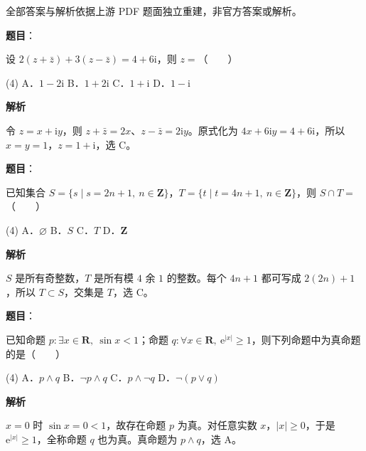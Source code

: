 

\begin{gktip}
全部答案与解析依据上游 PDF 题面独立重建，非官方答案或解析。
\end{gktip}


\begin{answer}

\textbf{题目}：

设 $2(z+\bar z)+3(z-\bar z)=4+6\mathrm i$，则 $z=$\mbox{（　　）}

\begin{gkopts}(4)
\task A．$1-2\mathrm i$
\task B．$1+2\mathrm i$
\task C．$1+\mathrm i$
\task D．$1-\mathrm i$
\end{gkopts}

\textbf{解析}

令 $z=x+\mathrm iy$，则 $z+\bar z=2x$、$z-\bar z=2\mathrm iy$。原式化为 $4x+6\mathrm iy=4+6\mathrm i$，所以 $x=y=1$，$z=1+\mathrm i$，选 C。


\end{answer}
\begin{answer}

\textbf{题目}：

已知集合 $S=\{s\mid s=2n+1,\ n\in\mathbf Z\}$，$T=\{t\mid t=4n+1,\ n\in\mathbf Z\}$，则 $S\cap T=$\mbox{（　　）}

\begin{gkopts}(4)
\task A．$\varnothing$
\task B．$S$
\task C．$T$
\task D．$\mathbf Z$
\end{gkopts}

\textbf{解析}

$S$ 是所有奇整数，$T$ 是所有模 $4$ 余 $1$ 的整数。每个 $4n+1$ 都可写成 $2(2n)+1$，所以 $T\subset S$，交集是 $T$，选 C。


\end{answer}
\begin{answer}

\textbf{题目}：

已知命题 $p:\exists x\in\mathbf R,\ \sin x<1$；命题 $q:\forall x\in\mathbf R,\ \mathrm e^{|x|}\geqslant1$，则下列命题中为真命题的是\mbox{（　　）}

\begin{gkopts}(4)
\task A．$p\land q$
\task B．$\neg p\land q$
\task C．$p\land\neg q$
\task D．$\neg(p\lor q)$
\end{gkopts}

\textbf{解析}

$x=0$ 时 $\sin x=0<1$，故存在命题 $p$ 为真。对任意实数 $x$，$|x|\geqslant0$，于是 $\mathrm e^{|x|}\geqslant1$，全称命题 $q$ 也为真。真命题为 $p\land q$，选 A。


\end{answer}
